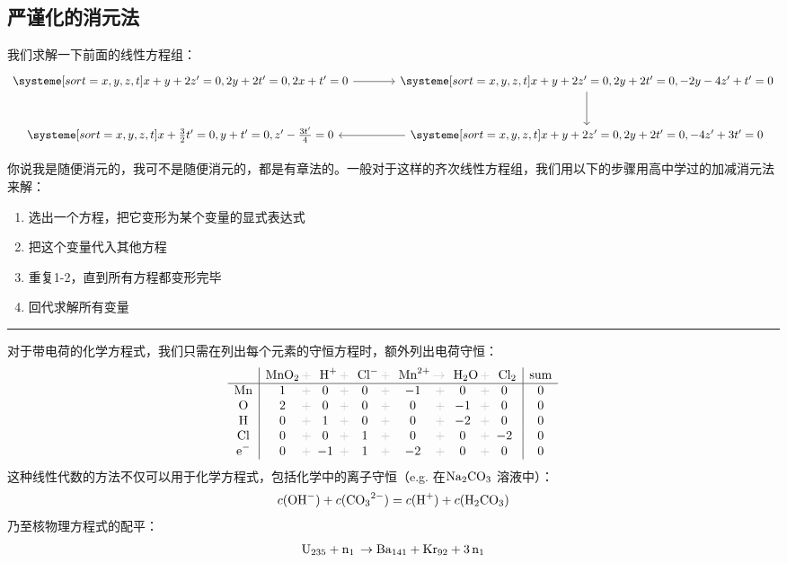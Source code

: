 \documentclass{ctexart}
\newcommand{\grayplus}{\,\color{lightgray}+\,}
\newcommand{\grayto}{\,\color{lightgray}\to\,}
\begin{document}
\subsection{严谨化的消元法}
我们求解一下前面的线性方程组：
\[
    \begin{tikzcd}[column sep=large, row sep=large]
        \systeme[sort={x, y, z, t}]{
            x + y + 2z^{\prime} = 0,
            2y + 2t^{\prime} = 0,
            2x + t^{\prime} = 0
        }
        \arrow[r] &
        \systeme[sort={x, y, z, t}]{
            x + y + 2z^{\prime} = 0,
            2y + 2t^{\prime} = 0,
            -2y - 4z^{\prime} +t^{\prime} = 0
        }
        \arrow[d] \\
        \systeme[sort={x, y, z, t}]{
            x + \frac{3}{2} t^{\prime} = 0,
            y + t^{\prime} = 0,
            z^{\prime} - \frac{3t^{\prime}}{4} = 0
        } &
        \systeme[sort={x, y, z, t}]{
            x + y + 2z^{\prime} = 0,
            2y + 2t^{\prime} = 0,
            - 4z^{\prime} + 3t^{\prime} = 0
        }
        \arrow[l]
    \end{tikzcd}
\]

你说我是随便消元的，我可不是随便消元的，都是有章法的。一般对于这样的齐次线性方程组，我们用以下的步骤用高中学过的加减消元法来解：

\begin{enumerate}
    \item 选出一个方程，把它变形为某个变量的显式表达式
    \item 把这个变量代入其他方程
    \item 重复1-2，直到所有方程都变形完毕
    \item 回代求解所有变量
\end{enumerate}

\hrule

对于带电荷的化学方程式，我们只需在列出每个元素的守恒方程时，额外列出电荷守恒：
\[
    \begin{array}{c|c@{\grayplus}c@{\grayplus}c@{\grayplus}c@{\grayplus}c@{\grayplus}c|c}
        & \multicolumn{1}{c@{\grayplus}}{\ce{MnO2}} &
        \multicolumn{1}{c@{\grayplus}}{\ce{H+}} &
        \multicolumn{1}{c@{\grayplus}}{\ce{Cl-}} &
        \multicolumn{1}{c@{\grayto}}{\ce{Mn^2+}} &
        \multicolumn{1}{c@{\grayplus}}{\ce{H2O}} &
        \multicolumn{1}{c|}{\ce{Cl2}} & \text{sum} \\
        \hline
        \ce{Mn} & 1 & 0 & 0 & -1 & 0 & 0 & 0\\
        \ce{O} & 2 & 0 & 0 & 0 & -1 & 0 & 0\\
        \ce{H} & 0 & 1 & 0 & 0 & -2 & 0 & 0\\
        \ce{Cl} & 0 & 0 & 1 & 0 & 0 & -2 & 0\\
        \ce{e^-} & 0 & -1 & 1 & -2 & 0 & 0 & 0\\
    \end{array}
\]
这种线性代数的方法不仅可以用于化学方程式，包括化学中的离子守恒（e.g. 在\(\ce{Na2CO3}\) 溶液中）：
\[
    c(\ce{OH^-}) + c(\ce{CO3^{2-}}) = c(\ce{H^+}) + c(\ce{H2CO3})
\]
乃至核物理方程式的配平：\[
    \ce{U235 + n1 \to Ba141 + Kr92 + 3n1}
\]
\end{document}
